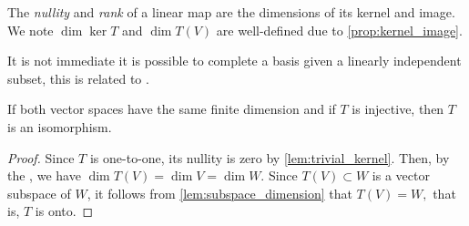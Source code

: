 \begin{remark}
    The \emph{nullity} and \emph{rank} of a linear map are the dimensions of its kernel and image. We note \(\dim \ker T\) and \(\dim T(V)\) are well-defined due to \cref{prop:kernel_image}.
\end{remark}
\begin{remark}
    It is not immediate it is possible to complete a basis given a linearly independent subset, this is related to .
\end{remark}
\begin{corollary}
    If both vector spaces have the same finite dimension and if \(T\) is injective, then \(T\) is an isomorphism.
\end{corollary}
\begin{proof}
    Since \(T\) is one-to-one, its nullity is zero by \cref{lem:trivial_kernel}. Then, by the , we have \(\dim T(V) = \dim V = \dim W\). Since \(T(V) \subset W\) is a vector subspace of \(W\), it follows from \cref{lem:subspace_dimension} that \(T(V) = W,\) that is, \(T\) is onto.
\end{proof}


